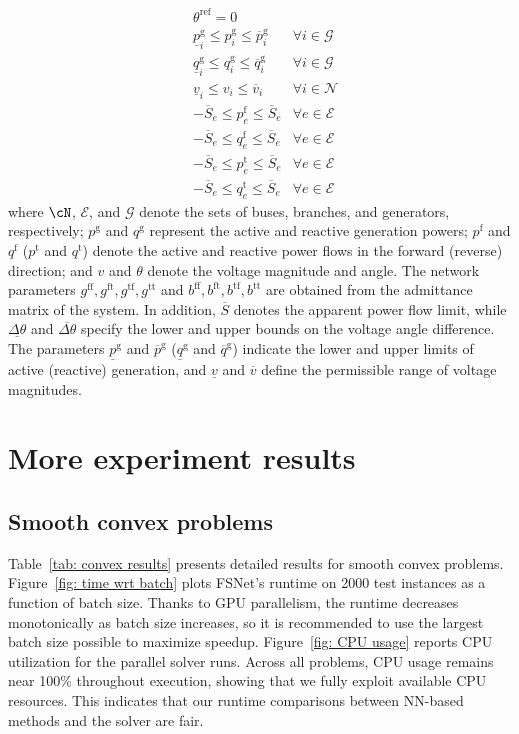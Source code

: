 \documentclass{article}
\def\cE{\mathcal{E}} \def\cF{\mathcal{F}} \def\cG{\mathcal{G}} \def\cH{\mathcal{H}}
\begin{document}
\begin{align*}
    & \theta^{\text{ref}} = 0 \\
    & \underline{p}_i^\mathrm{g} \leq p_i^\mathrm{g} \leq \overline{p}_i^\mathrm{g} & \forall i \in \mathcal{G} \\
    & \underline{q}_i^\mathrm{g} \leq q_i^\mathrm{g} \leq \overline{q}_i^\mathrm{g} & \forall i \in \mathcal{G} \\
    & \underline{v}_i \leq v_i \leq \overline{v}_i & \forall i \in \mathcal{N} \\
    & -\overline{S}_e \leq p_e^\mathrm{f} \leq \overline{S}_e & \forall e \in \mathcal{E} \\
    & -\overline{S}_e \leq q_e^\mathrm{f} \leq \overline{S}_e & \forall e \in \mathcal{E} \\
    & -\overline{S}_e \leq p_e^\mathrm{t} \leq \overline{S}_e & \forall e \in \mathcal{E} \\
    & -\overline{S}_e \leq q_e^\mathrm{t} \leq \overline{S}_e & \forall e \in \mathcal{E}
\end{align*}
where $\cN$, $\cE$, and $\cG$ denote the sets of buses, branches, and generators, respectively; $p^\mathrm{g}$ and $q^\mathrm{g}$ represent the active and reactive generation powers; $p^\mathrm{f}$ and $ q^\mathrm{f}$ ($p^\mathrm{t}$ and $ q^\mathrm{t}$) denote the active and reactive power flows in the forward (reverse) direction; and $v$ and $\theta$ denote the voltage magnitude and angle. The network parameters $g^\mathrm{ff}, g^\mathrm{ft}, g^\mathrm{tf}, g^\mathrm{tt}$ and $b^\mathrm{ff}, b^\mathrm{ft}, b^\mathrm{tf}, b^\mathrm{tt}$ are obtained from the admittance matrix of the system.
In addition, $\overline{S}$ denotes the apparent power flow limit, while $\underline{\Delta \theta}$ and $\overline{\Delta \theta}$ specify the lower and upper bounds on the voltage angle difference. The parameters $\underline{p}^\mathrm{g}$ and $\overline{p}^\mathrm{g}$ ($\underline{q}^\mathrm{g}$ and $\overline{q}^\mathrm{g}$) indicate the lower and upper limits of active (reactive) generation, and $\underline{v}$ and $\overline{v}$ define the permissible range of voltage magnitudes.


\clearpage
\section{More experiment results}\label{appendix: more experiments}
\subsection{Smooth convex problems}
Table~\ref{tab: convex results} presents detailed results for smooth convex problems. Figure~\ref{fig: time wrt batch} plots FSNet’s runtime on 2000 test instances as a function of batch size. 
Thanks to GPU parallelism, the runtime decreases monotonically as batch size increases, so it is recommended to use the largest batch size possible to maximize speedup. 
Figure~\ref{fig: CPU usage} reports CPU utilization for the parallel solver runs. Across all problems, CPU usage remains near 100$\%$ throughout execution, showing that we fully exploit available CPU resources. This indicates that our runtime comparisons between NN-based methods and the solver are fair.
\end{document}

